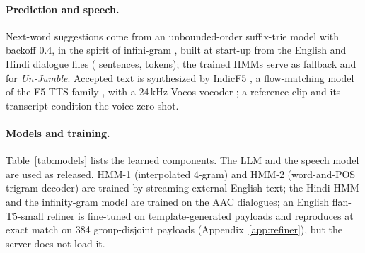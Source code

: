 \paragraph{Prediction and speech.}
Next-word suggestions come from an unbounded-order suffix-trie model with backoff 0.4, in the spirit of infini-gram \citep{liu2024infinigram}, built at start-up from the English and Hindi dialogue files (\IGSent{} sentences, \IGTok{} tokens); the trained HMMs serve as fallback and for \emph{Un-Jumble}.
Accepted text is synthesized by IndicF5 \citep{ai4bharat2025indicf5}, a flow-matching model of the F5-TTS family \citep{chen2025f5tts}, with a 24\,kHz Vocos vocoder \citep{siuzdak2023vocos}; a reference clip and its transcript condition the voice zero-shot.

\paragraph{Models and training.}
Table~\ref{tab:models} lists the learned components. The LLM and the speech model are used as released.
HMM-1 (interpolated 4-gram) and HMM-2 (word-and-POS trigram decoder) are trained by streaming external English text; the Hindi HMM and the infinity-gram model are trained on the AAC dialogues; an English flan-T5-small refiner is fine-tuned on template-generated payloads and reproduces at \RefAModelPct{} exact match on 384 group-disjoint payloads (Appendix~\ref{app:refiner}), but the server does not load it.

